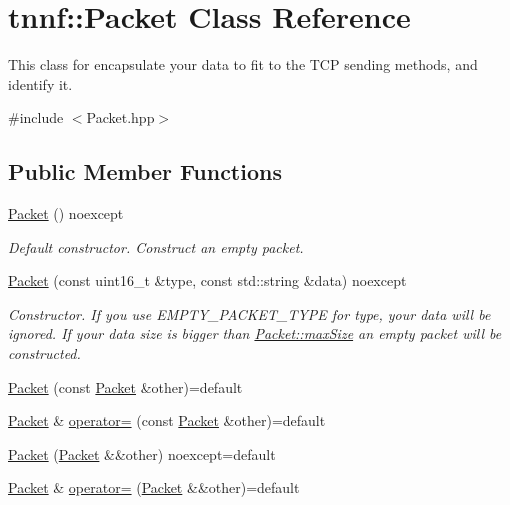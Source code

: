 \hypertarget{classtnnf_1_1_packet}{}\section{tnnf\+:\+:Packet Class Reference}
\label{classtnnf_1_1_packet}


This class for encapsulate your data to fit to the T\+C\+P sending methods, and identify it.  




{\ttfamily \#include $<$Packet.\+hpp$>$}

\subsection*{Public Member Functions}
\begin{DoxyCompactItemize}
\item 
\hyperlink{classtnnf_1_1_packet_adc9768f6015196a2ba91e68e73a2e40f}{Packet} () noexcept
\begin{DoxyCompactList}\small\item\em Default constructor. Construct an empty packet. \end{DoxyCompactList}\item 
\hyperlink{classtnnf_1_1_packet_acb5c358da2838f5e513e2b0f5057af9f}{Packet} (const uint16\+\_\+t \&type, const std\+::string \&data) noexcept
\begin{DoxyCompactList}\small\item\em Constructor. If you use E\+M\+P\+T\+Y\+\_\+\+P\+A\+C\+K\+E\+T\+\_\+\+T\+Y\+P\+E for type, your data will be ignored. If your data size is bigger than \hyperlink{classtnnf_1_1_packet_a10b2f3efc472cddea13827383b65c8d5}{Packet\+::max\+Size} an empty packet will be constructed. \end{DoxyCompactList}\item 
\hyperlink{classtnnf_1_1_packet_a3531402e8c7d9b8e9d3c40a04c0bcf2d}{Packet} (const \hyperlink{classtnnf_1_1_packet}{Packet} \&other)=default
\item 
\hyperlink{classtnnf_1_1_packet}{Packet} \& \hyperlink{classtnnf_1_1_packet_ac1537df479ac75e431e70e3337ee9c83}{operator=} (const \hyperlink{classtnnf_1_1_packet}{Packet} \&other)=default
\item 
\hyperlink{classtnnf_1_1_packet_aa95e765c361abbd34f8a0ffc9faefef4}{Packet} (\hyperlink{classtnnf_1_1_packet}{Packet} \&\&other) noexcept=default
\item 
\hyperlink{classtnnf_1_1_packet}{Packet} \& \hyperlink{classtnnf_1_1_packet_aabb38c2578724894d72e999282af3c11}{operator=} (\hyperlink{classtnnf_1_1_packet}{Packet} \&\&other)=default

\end{DoxyCompactItemize}
